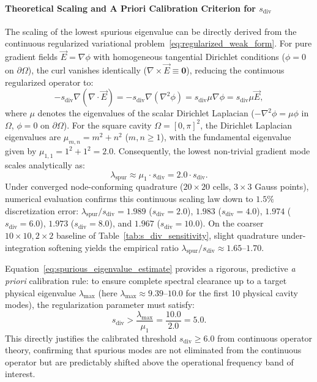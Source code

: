 \documentclass[preprint,12pt]{elsarticle}
\begin{document}
\paragraph{Theoretical Scaling and A Priori Calibration Criterion for $s_{\mathrm{div}}$}
The scaling of the lowest spurious eigenvalue can be directly derived from the continuous regularized variational problem~\eqref{eq:regularized_weak_form}. For pure gradient fields $\vec{E} = \nabla\phi$ with homogeneous tangential Dirichlet conditions ($\phi = 0$ on $\partial\Omega$), the curl vanishes identically ($\nabla \times \vec{E} \equiv \mathbf{0}$), reducing the continuous regularized operator to:
\begin{equation}
    -s_{\mathrm{div}}\nabla(\nabla \cdot \vec{E}) = -s_{\mathrm{div}}\nabla(\nabla^2\phi) = s_{\mathrm{div}}\mu \nabla\phi = s_{\mathrm{div}}\mu \vec{E},
    \label{eq:analytical_spurious_scaling}
\end{equation}
where $\mu$ denotes the eigenvalues of the scalar Dirichlet Laplacian ($-\nabla^2\phi = \mu\phi$ in $\Omega$, $\phi=0$ on $\partial\Omega$). For the square cavity $\Omega = [0, \pi]^2$, the Dirichlet Laplacian eigenvalues are $\mu_{m,n} = m^2 + n^2$ ($m,n \ge 1$), with the fundamental eigenvalue given by $\mu_{1,1} = 1^2 + 1^2 = 2.0$. Consequently, the lowest non-trivial gradient mode scales analytically as:
\begin{equation}
    \lambda_{\mathrm{spur}} \approx \mu_1 \cdot s_{\mathrm{div}} = 2.0 \cdot s_{\mathrm{div}}.
    \label{eq:spurious_eigenvalue_estimate}
\end{equation}
Under converged node-conforming quadrature ($20 \times 20$ cells, $3 \times 3$ Gauss points), numerical evaluation confirms this continuous scaling law down to $1.5\%$ discretization error: $\lambda_{\mathrm{spur}}/s_{\mathrm{div}} = 1.989$ ($s_{\mathrm{div}}=2.0$), $1.983$ ($s_{\mathrm{div}}=4.0$), $1.974$ ($s_{\mathrm{div}}=6.0$), $1.973$ ($s_{\mathrm{div}}=8.0$), and $1.967$ ($s_{\mathrm{div}}=10.0$). On the coarser $10 \times 10, 2 \times 2$ baseline of Table~\ref{tab:s_div_sensitivity}, slight quadrature under-integration softening yields the empirical ratio $\lambda_{\mathrm{spur}}/s_{\mathrm{div}} \approx 1.65\text{--}1.70$.

Equation~\eqref{eq:spurious_eigenvalue_estimate} provides a rigorous, predictive \emph{a priori} calibration rule: to ensure complete spectral clearance up to a target physical eigenvalue $\lambda_{\max}$ (here $\lambda_{\max} \approx 9.39\text{--}10.0$ for the first 10 physical cavity modes), the regularization parameter must satisfy:
\begin{equation}
    s_{\mathrm{div}} > \frac{\lambda_{\max}}{\mu_1} = \frac{10.0}{2.0} = 5.0.
    \label{eq:a_priori_s_div_rule}
\end{equation}
This directly justifies the calibrated threshold $s_{\mathrm{div}} \ge 6.0$ from continuous operator theory, confirming that spurious modes are not eliminated from the continuous operator but are predictably shifted above the operational frequency band of interest.
\end{document}
